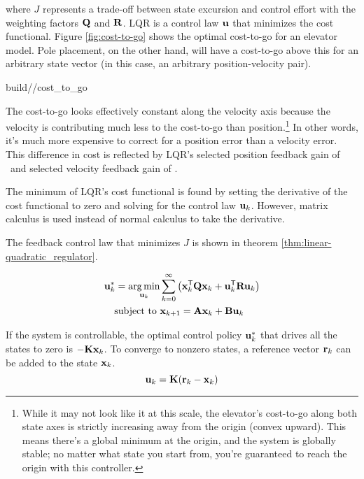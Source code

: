 where $J$ represents a trade-off between \gls{state} excursion and
\gls{control effort} with the weighting factors $\mathbf{Q}$ and $\mathbf{R}$. LQR is
a \gls{control law} $\mathbf{u}$ that minimizes the cost functional. Figure
\ref{fig:cost-to-go} shows the optimal cost-to-go for an elevator model. Pole
placement, on the other hand, will have a cost-to-go above this for an arbitrary
state vector (in this case, an arbitrary position-velocity pair).
\begin{svg}{build/\chapterpath/cost_to_go}
  \caption{Cost-to-go for elevator model}
  \label{fig:cost-to-go}
\end{svg}

The cost-to-go looks effectively constant along the velocity axis because the
velocity is contributing much less to the cost-to-go than
position.\footnote{While it may not look like it at this scale, the elevator's
cost-to-go along both state axes is strictly increasing away from the origin
(convex upward). This means there's a global minimum at the origin, and the
system is globally stable; no matter what state you start from, you're
guaranteed to reach the origin with this controller.} In other words, it's much
more expensive to correct for a position error than a velocity error. This
difference in cost is reflected by LQR's selected position feedback gain of
\unskip~and selected velocity feedback
gain of \unskip.

The minimum of LQR's cost functional is found by setting the derivative of the
cost functional to zero and solving for the \gls{control law} $\mathbf{u}_k$.
However, matrix calculus is used instead of normal calculus to take the
derivative.

The feedback \gls{control law} that minimizes $J$ is shown in theorem
\ref{thm:linear-quadratic_regulator}.
\begin{theorem}
  \label{thm:linear-quadratic_regulator}
  \begin{align}
    \mathbf{u}_k^* = \operatorname*{arg\,min}_{\mathbf{u}_k} &\sum\limits_{k=0}^\infty
      \left(\mathbf{x}_k^\mathsf{T}\mathbf{Q}\mathbf{x}_k + \mathbf{u}_k^\mathsf{T}\mathbf{R}\mathbf{u}_k\right)
      \nonumber \\
    \text{subject to } &\mathbf{x}_{k+1} = \mathbf{A}\mathbf{x}_k + \mathbf{B}\mathbf{u}_k
  \end{align}

  If the \gls{system} is controllable, the optimal control policy $\mathbf{u}_k^*$
  that drives all the \glspl{state} to zero is $-\mathbf{K}\mathbf{x}_k$. To converge
  to nonzero \glspl{state}, a \gls{reference} vector $\mathbf{r}_k$ can be added to
  the \gls{state} $\mathbf{x}_k$.
  \begin{equation}
    \mathbf{u}_k = \mathbf{K}(\mathbf{r}_k - \mathbf{x}_k)
  \end{equation}
\end{theorem}

